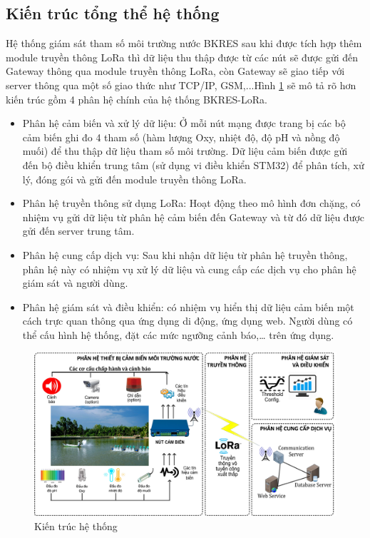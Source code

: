 \subsection{Kiến trúc tổng thể hệ thống}
Hệ thống giám sát tham số môi trường nước BKRES sau khi được tích hợp thêm module truyền thông LoRa thì dữ liệu thu thập được từ các nút sẽ được gửi đến Gateway thông qua module truyền thông LoRa, còn Gateway sẽ giao tiếp với server thông qua một số giao thức như TCP/IP, GSM,...Hình \ref{construction}{} sẽ mô tả rõ hơn kiến trúc gồm 4 phân hệ chính của hệ thống BKRES-LoRa.
\begin{itemize}
	\item Phân hệ cảm biến và xử lý dữ liệu: Ở mỗi nút mạng được trang bị các bộ cảm biến ghi đo 4 tham số (hàm lượng Oxy, nhiệt độ, độ pH và nồng độ muối) để thu thập dữ liệu tham số môi trường. Dữ liệu cảm biến được gửi đến bộ điều khiển trung tâm (sử dụng vi điều khiển STM32) để phân tích, xử lý, đóng gói và gửi đến module truyền thông LoRa.
	\item Phân hệ truyền thông sử dụng LoRa: Hoạt động theo mô hình đơn chặng, có nhiệm vụ gửi dữ liệu từ phân hệ cảm biến đến Gateway và từ đó dữ liệu được gửi đến server trung tâm.
	\item Phân hệ cung cấp dịch vụ: Sau khi nhận dữ liệu từ phân hệ truyền thông, phân hệ này có nhiệm vụ xử lý dữ liệu và cung cấp các dịch vụ cho phân hệ giám sát và người dùng.
	\item Phân hệ giám sát và điều khiển: có nhiệm vụ hiển thị dữ liệu cảm biến một cách trực quan thông qua ứng dụng di động, ứng dụng web. Người dùng có thể cấu hình hệ thống, đặt các mức ngưỡng cảnh báo,… trên ứng dụng.
\end{itemize}
\begin{center}
\begin{figure}
\begin{center}
\includegraphics[scale=0.15]{image/kientrucLoRa}
\end{center}
\caption{Kiến trúc hệ thống}
\label{construction}
\end{figure}
\end{center}
